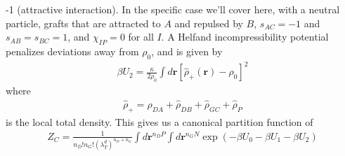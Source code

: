 \documentclass{article}
\begin{document}
  -1 (attractive interaction).
In the specific case we'll cover here, with a neutral particle, grafts that
  are attracted to $A$ and repulsed by $B$, $s_{AC} = -1$ and
  $s_{AB} = s_{BC} = 1$, and $\chi_{IP} = 0$ for all $I$.
A Helfand incompressibility potential penalizes deviations away from $\rho_0$,
  and is given by
\begin{align*}
  \beta U_2 = \frac{\kappa}{2 \rho_0} \int d \mathbf{r}
    \left[ \hat{\rho}_+ (\mathbf{r}) - \rho_0 \right] ^ 2
\end{align*}
where
\begin{align*}
  \hat{\rho}_+ =
    \hat{\rho}_{DA} + \hat{\rho}_{DB} + \hat{\rho}_{GC} + \hat{\rho}_P
\end{align*}
  is the local total density.
This gives us a canonical partition function of
\begin{align*}
  Z_C = \frac{1}{n_D!n_G! \left( \lambda_T^d \right)^{n_D+n_G}}
    \int d \mathbf{r}^{n_DP} \int d \mathbf{r}^{n_GN}
    \exp \left( -\beta U_0 - \beta U_1 - \beta U_2 \right)
\end{align*}
\end{document}
